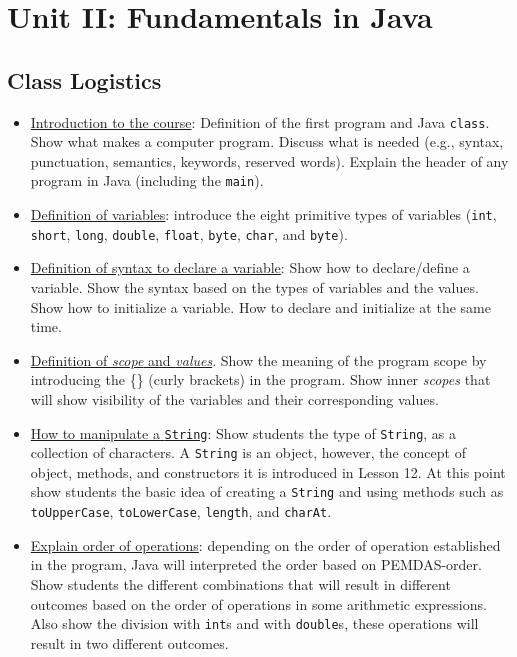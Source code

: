 \section{Unit II: Fundamentals in Java}
\subsection{Class Logistics}
\begin{itemize}
	\item \underline{Introduction to the course}: Definition of the first program and Java \texttt{class}.
	Show what makes a computer program. Discuss what is needed (e.g., syntax, punctuation, semantics, keywords,
	reserved words). Explain the header of any program in Java (including the \texttt{main}). 
	\item \underline{Definition of variables}: introduce the eight primitive types of variables (\texttt{int},
	\texttt{short}, \texttt{long}, \texttt{double}, \texttt{float}, \texttt{byte}, \texttt{char}, and
	\texttt{byte}).  
	\item \underline{Definition of syntax to declare a variable}: Show how to declare/define a variable. 
	Show the syntax based on the types of variables and the values. Show how to initialize a variable. 
	How to declare and initialize at the same time. 
	\item \underline{Definition of \emph{scope} and \emph{values}}. Show the meaning of the program scope
	by introducing the \{\} (curly brackets) in the program. Show inner \emph{scopes} that will show visibility 
	of the variables and their corresponding values.
	
	\item \underline{How to manipulate a \texttt{String}}: Show students the type of \texttt{String}, as a collection
	of characters. A \texttt{String} is an object, however, the concept of object, methods, and constructors it is 
	introduced in Lesson 12. At this point show students the basic idea of creating a \texttt{String} and using 
	methods such as \texttt{toUpperCase}, \texttt{toLowerCase}, \texttt{length}, and \texttt{charAt}.
	
	\item \underline{Explain order of operations}: depending on the order of operation established in the program,
	Java will interpreted the order based on PEMDAS-order. Show students the different combinations that will
	result in different outcomes based on the order of operations in some arithmetic expressions. Also show the 
	division with \texttt{int}s and with \texttt{double}s, these operations will result in two different outcomes.
	

\end{itemize}
